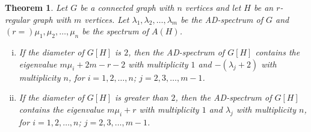 \documentclass[12pt]{article}
\numberwithin{equation}{section}
\newtheorem{thm}{Theorem}[section]
\begin{document}
	\begin{thm}
		Let $G$ be a connected graph with $n$ vertices and let $H$ be an $r$-regular graph with $m$ vertices. Let $\lambda_{1}, \lambda_2, \dots, \lambda_m$ be the AD-spectrum of $G$ and $(r=)\mu_1, \mu_2, \dots , \mu_n$ be the spectrum of $A(H)$. 
		\begin{enumerate}[(i)]
			\item If the diameter of $G[H]$ is $2$, then the AD-spectrum of $G[H]$ contains the eigenvalue $m \mu_i+2m-r-2$ with multiplicity $1$ and $-(\lambda_j+2)$ with multiplicity $n$, for $i=1,2,\dots,n$; $j=2,3,\dots,m-1$.

			\item If the diameter of $G[H]$ is greater than $2$, then the AD-spectrum of $G[H]$ contains the eigenvalue $m \mu_i+r$ with multiplicity $1$ and $\lambda_j$ with multiplicity $n$, for $i=1,2,\dots,n$; $j=2,3,\dots,m-1$.
		\end{enumerate}
		\end{thm}
\end{document}
